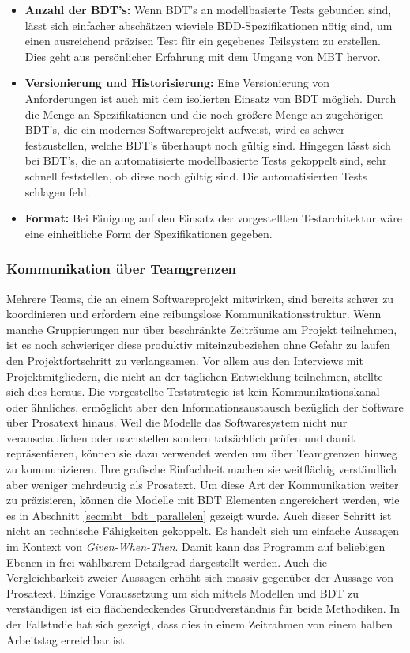 \begin{itemize}
\item \textbf{Anzahl der \Gls{BDT}'s:} Wenn \Gls{BDT}'s  an modellbasierte Tests gebunden sind, lässt sich einfacher abschätzen wieviele \Gls{BDD}-Spezifikationen nötig sind, um einen ausreichend präzisen Test für ein gegebenes Teilsystem zu erstellen. Dies geht aus persönlicher Erfahrung mit dem Umgang von \Gls{MBT} hervor.
\item \textbf{Versionierung und Historisierung:} Eine Versionierung von Anforderungen ist auch mit dem isolierten Einsatz von \Gls{BDT} möglich. Durch die Menge an Spezifikationen und die noch größere Menge an zugehörigen \Gls{BDT}'s, die ein modernes Softwareprojekt aufweist, wird es schwer festzustellen, welche \Gls{BDT}'s überhaupt noch gültig sind. Hingegen lässt sich bei \Gls{BDT}'s, die an automatisierte modellbasierte Tests gekoppelt sind, sehr schnell feststellen, ob diese noch gültig sind. Die automatisierten Tests schlagen fehl.
\item \textbf{Format:} Bei Einigung auf den Einsatz der vorgestellten Testarchitektur wäre eine einheitliche Form der Spezifikationen gegeben.
\end{itemize}

\subsubsection{Kommunikation über Teamgrenzen}
Mehrere Teams, die an einem Softwareprojekt mitwirken, sind bereits schwer zu koordinieren und erfordern eine reibungslose Kommunikationsstruktur. Wenn manche Gruppierungen nur über beschränkte Zeiträume am Projekt teilnehmen, ist es noch schwieriger diese produktiv miteinzubeziehen ohne Gefahr zu laufen den Projektfortschritt zu verlangsamen. Vor allem aus den Interviews mit Projektmitgliedern, die nicht an der täglichen Entwicklung teilnehmen, stellte sich dies heraus. Die vorgestellte Teststrategie ist kein Kommunikationskanal oder ähnliches, ermöglicht aber den Informationsaustausch bezüglich der Software über Prosatext hinaus. Weil die Modelle das Softwaresystem nicht nur veranschaulichen oder nachstellen sondern tatsächlich prüfen und damit repräsentieren, können sie dazu verwendet werden um über Teamgrenzen hinweg zu kommunizieren. Ihre grafische Einfachheit machen sie weitflächig verständlich aber weniger mehrdeutig als Prosatext. Um diese Art der Kommunikation weiter zu präzisieren, können die Modelle mit \Gls{BDT} Elementen angereichert werden, wie es in Abschnitt \ref{sec:mbt_bdt_parallelen} gezeigt wurde. Auch dieser Schritt ist nicht an technische Fähigkeiten gekoppelt. Es handelt sich um einfache Aussagen im Kontext von \textit{Given-When-Then}. Damit kann das Programm auf beliebigen Ebenen in frei wählbarem Detailgrad dargestellt werden. Auch die Vergleichbarkeit zweier Aussagen erhöht sich massiv gegenüber der Aussage von Prosatext. Einzige Voraussetzung um sich mittels Modellen und BDT zu verständigen ist ein flächendeckendes Grundverständnis für beide Methodiken. In der Fallstudie hat sich gezeigt, dass dies in einem Zeitrahmen von einem halben Arbeitstag erreichbar ist.

